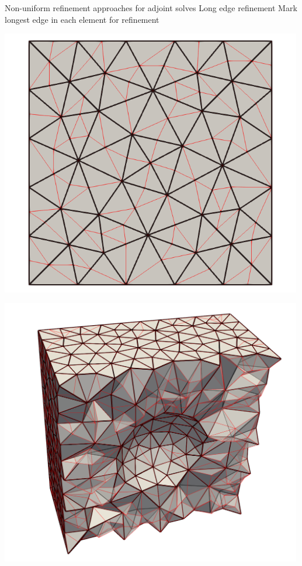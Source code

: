 \documentclass[fleqn]{beamer}
\begin{document}

\begin{frame}{Non-uniform refinement approaches for adjoint solves}
{Long edge refinement}
Mark longest edge in each element for refinement
\begin{minipage}{0.5\textwidth}
\centering
\includegraphics[width=0.99\textwidth]{../img/refine_long_mesh}
\end{minipage}%
\begin{minipage}{0.5\textwidth}
\centering
\includegraphics[width=0.99\textwidth]{../img/refine_long_mesh_3D}
\end{minipage}
\end{frame}
\end{document}
